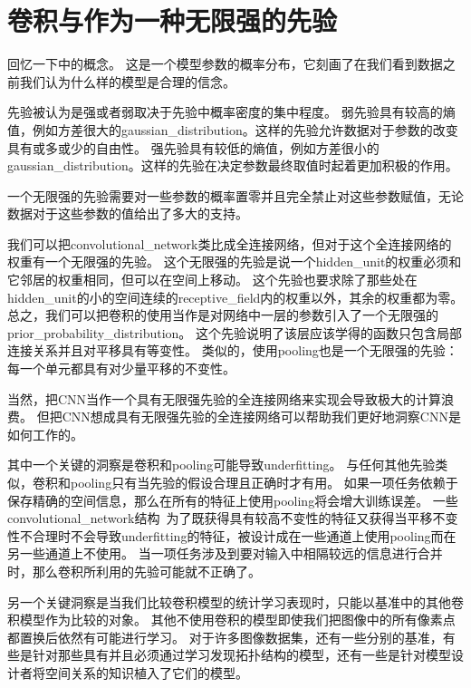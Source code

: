 \section{卷积与作为一种无限强的先验}
\label{sec:convolution_and_pooling_as_an_infinitely_strong_prior}

回忆一下中的概念。
这是一个模型参数的概率分布，它刻画了在我们看到数据之前我们认为什么样的模型是合理的信念。

 
先验被认为是强或者弱取决于先验中概率密度的集中程度。
弱先验具有较高的熵值，例如方差很大的\gls{gaussian_distribution}。这样的先验允许数据对于参数的改变具有或多或少的自由性。
强先验具有较低的熵值，例如方差很小的\gls{gaussian_distribution}。这样的先验在决定参数最终取值时起着更加积极的作用。

一个无限强的先验需要对一些参数的概率置零并且完全禁止对这些参数赋值，无论数据对于这些参数的值给出了多大的支持。

我们可以把\gls{convolutional_network}类比成全连接网络，但对于这个全连接网络的权重有一个无限强的先验。
这个无限强的先验是说一个\gls{hidden_unit}的权重必须和它邻居的权重相同，但可以在空间上移动。
这个先验也要求除了那些处在\gls{hidden_unit}的小的空间连续的\gls{receptive_field}内的权重以外，其余的权重都为零。
总之，我们可以把卷积的使用当作是对网络中一层的参数引入了一个无限强的\gls{prior_probability_distribution}。
这个先验说明了该层应该学得的函数只包含局部连接关系并且对平移具有等变性。
类似的，使用\gls{pooling}也是一个无限强的先验：每一个单元都具有对少量平移的不变性。

当然，把\gls{CNN}当作一个具有无限强先验的全连接网络来实现会导致极大的计算浪费。
但把\gls{CNN}想成具有无限强先验的全连接网络可以帮助我们更好地洞察\gls{CNN}是如何工作的。

其中一个关键的洞察是卷积和\gls{pooling}可能导致\gls{underfitting}。
与任何其他先验类似，卷积和\gls{pooling}只有当先验的假设合理且正确时才有用。
如果一项任务依赖于保存精确的空间信息，那么在所有的特征上使用\gls{pooling}将会增大训练误差。
一些\gls{convolutional_network}结构~\citep{Szegedy-et-al-arxiv2014}为了既获得具有较高不变性的特征又获得当平移不变性不合理时不会导致\gls{underfitting}的特征，被设计成在一些通道上使用\gls{pooling}而在另一些通道上不使用。
当一项任务涉及到要对输入中相隔较远的信息进行合并时，那么卷积所利用的先验可能就不正确了。

另一个关键洞察是当我们比较卷积模型的统计学习表现时，只能以基准中的其他卷积模型作为比较的对象。
其他不使用卷积的模型即使我们把图像中的所有像素点都置换后依然有可能进行学习。
对于许多图像数据集，还有一些分别的基准，有些是针对那些具有并且必须通过学习发现拓扑结构的模型，还有一些是针对模型设计者将空间关系的知识植入了它们的模型。

